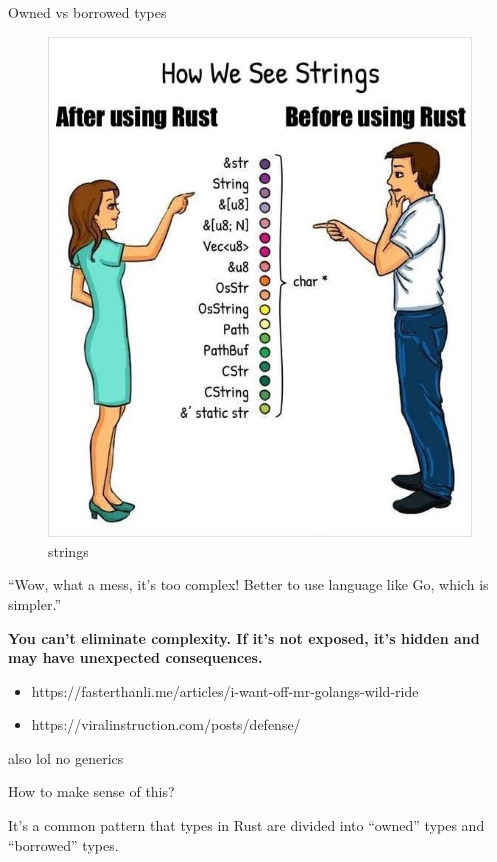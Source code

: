 \documentclass[
  9pt,
  ignorenonframetext,
]{beamer}
\providecommand{\tightlist}{%
  \setlength{\itemsep}{0pt}\setlength{\parskip}{0pt}}
\begin{document}
\begin{frame}{Owned vs borrowed types}
\begin{figure}
\centering
\includegraphics{img/strings.jpg}
\caption{strings}
\end{figure}

``Wow, what a mess, it's too complex! Better to use language like Go,
which is simpler.''

\textbf{You can't eliminate complexity. If it's not exposed, it's hidden
and may have unexpected consequences.}

\begin{itemize}
\tightlist
\item
  https://fasterthanli.me/articles/i-want-off-mr-golangs-wild-ride
\item
  https://viralinstruction.com/posts/defense/
\end{itemize}

also lol no generics
\end{frame}

\begin{frame}
How to make sense of this?

It's a common pattern that types in Rust are divided into ``owned''
types and ``borrowed'' types.
\end{frame}
\end{document}
